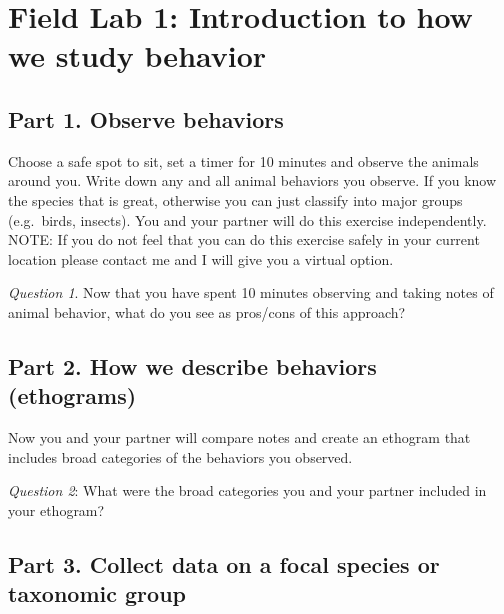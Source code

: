 \documentclass[]{book}
\begin{document}
\hypertarget{field-lab-1-introduction-to-how-we-study-behavior}{%
\chapter*{Field Lab 1: Introduction to how we study behavior}\label{field-lab-1-introduction-to-how-we-study-behavior}}

\hypertarget{part-1.-observe-behaviors}{%
\section*{Part 1. Observe behaviors}\label{part-1.-observe-behaviors}}

Choose a safe spot to sit, set a timer for 10 minutes and observe the animals around you. Write down any and all animal behaviors you observe. If you know the species that is great, otherwise you can just classify into major groups (e.g.~birds, insects). You and your partner will do this exercise independently. NOTE: If you do not feel that you can do this exercise safely in your current location please contact me and I will give you a virtual option.

\emph{Question 1}. Now that you have spent 10 minutes observing and taking notes of animal behavior, what do you see as pros/cons of this approach?

\hypertarget{part-2.-how-we-describe-behaviors-ethograms}{%
\section*{Part 2. How we describe behaviors (ethograms)}\label{part-2.-how-we-describe-behaviors-ethograms}}

Now you and your partner will compare notes and create an ethogram that includes broad categories of the behaviors you observed.

\emph{Question 2}: What were the broad categories you and your partner included in your ethogram?

\hypertarget{part-3.-collect-data-on-a-focal-species-or-taxonomic-group}{%
\section*{Part 3. Collect data on a focal species or taxonomic group}\label{part-3.-collect-data-on-a-focal-species-or-taxonomic-group}}
\end{document}
